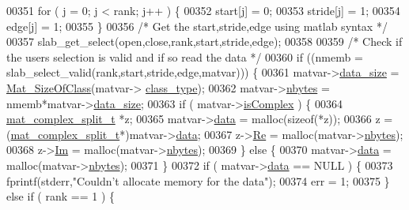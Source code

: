 \begin{DoxyCode}
{{{{{{00351             \textcolor{keywordflow}{for} ( j = 0; j < rank; j++ ) \{
00352                 start[j]  = 0;
00353                 stride[j] = 1;
00354                 edge[j]   = 1;
00355             \}
00356             \textcolor{comment}{/* Get the start,stride,edge using matlab syntax */}
00357             slab\_get\_select(open,close,rank,start,stride,edge);
00358 
00359             \textcolor{comment}{/* Check if the users selection is valid and if so read the data */}
00360             \textcolor{keywordflow}{if} ((nmemb = slab\_select\_valid(rank,start,stride,edge,matvar))) \{
00361                  matvar->\hyperlink{group___m_a_t_a9ad1c82e2b568da617e12dc73a26e1f9}{data\_size} = \hyperlink{group___m_a_t_ga2bf682f015b22fa796a8885e997661e7}{Mat\_SizeOfClass}(matvar->
      \hyperlink{group___m_a_t_aff13035bf3265dd7d9425e5d40c839d4}{class\_type});
00362                  matvar->\hyperlink{group___m_a_t_abf1c844540503be2df9bb3db93cfe307}{nbytes} = nmemb*matvar->\hyperlink{group___m_a_t_a9ad1c82e2b568da617e12dc73a26e1f9}{data\_size};
00363                 \textcolor{keywordflow}{if} ( matvar->\hyperlink{group___m_a_t_aeb03b3a69f108dc05470b00443a43739}{isComplex} ) \{
00364                     \hyperlink{group___m_a_t_structmat__complex__split__t}{mat\_complex\_split\_t} *z;
00365                     matvar->\hyperlink{group___m_a_t_a5672978efa230bbdecdf38ede781f7fa}{data} = malloc(\textcolor{keyword}{sizeof}(*z));
00366                     z = (\hyperlink{group___m_a_t_structmat__complex__split__t}{mat\_complex\_split\_t}*)matvar->\hyperlink{group___m_a_t_a5672978efa230bbdecdf38ede781f7fa}{data};
00367                     z->\hyperlink{group___m_a_t_a484a93607508adac2bce53a0252e0325}{Re} = malloc(matvar->\hyperlink{group___m_a_t_abf1c844540503be2df9bb3db93cfe307}{nbytes});
00368                     z->\hyperlink{group___m_a_t_a7182d10b0d3598415887376065440946}{Im} = malloc(matvar->\hyperlink{group___m_a_t_abf1c844540503be2df9bb3db93cfe307}{nbytes});
00369                 \} \textcolor{keywordflow}{else} \{
00370                     matvar->\hyperlink{group___m_a_t_a5672978efa230bbdecdf38ede781f7fa}{data} = malloc(matvar->\hyperlink{group___m_a_t_abf1c844540503be2df9bb3db93cfe307}{nbytes});
00371                 \}
00372                 \textcolor{keywordflow}{if} ( matvar->\hyperlink{group___m_a_t_a5672978efa230bbdecdf38ede781f7fa}{data} == NULL ) \{
00373                     fprintf(stderr,\textcolor{stringliteral}{"Couldn't allocate memory for the data"});
00374                     err = 1;
00375                 \} \textcolor{keywordflow}{else} \textcolor{keywordflow}{if} ( rank == 1 ) \{
}}}}}}
\end{DoxyCode}
